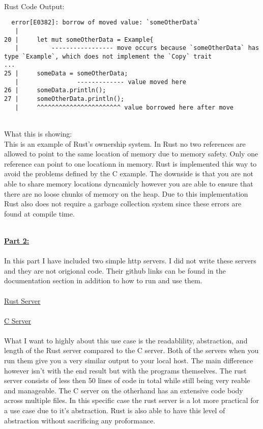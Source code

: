 \documentclass{article}
\theoremstyle{theorem}
\theoremstyle{definition}
\theoremstyle{remark}
\begin{document}
\\Rust Code Output:
\begin{lstlisting}
  error[E0382]: borrow of moved value: `someOtherData`
   |
20 |     let mut someOtherData = Example{
   |         ----------------- move occurs because `someOtherData` has type `Example`, which does not implement the `Copy` trait
...
25 |     someData = someOtherData;
   |                ------------- value moved here
26 |     someData.println();
27 |     someOtherData.println();
   |     ^^^^^^^^^^^^^^^^^^^^^^^ value borrowed here after move
\end{lstlisting}
\\What this is showing:
\\This is an example of Rust's ownership system. In Rust no two references are allowed to point to the same location of memory due to memory safety. Only one reference can point to one locationn in memory.
Rust is implemented this way to avoid the problems defined by the C example. The downside is that you are not able to share memory locations dyncamicly however you are able to ensure that there are no loose
chunks of memory on the heap. Due to this implementation Rust also does not require a garbage collection system since these errors are found at compile time.

\\\underline{ \textbf{Part 2:}}
\\
\\In this part I have included two simple http servers. I did not write these servers and they are not origional code. Their github links can be found in the documentation section in addition to how to run and use them.
\\
\\\href{https://github.com/jacgoldberg/Programming-Lang/blob/main/samplerustserver/http_server.rs}{Rust Server}
\\
\\\href{https://github.com/jacgoldberg/Programming-Lang/tree/main/samplecserver}{C Server}
\\
\\What I want to highly about this use case is the readablility, abstraction, and length of the Rust server compared to the C server. Both of the servers when you run them give you a very similar output to your local host.
The main difference however isn't with the end result but with the programs themselves. The rust server consists of less then 50 lines of code in total while still being very reable and manageable. The C server on the otherhand has an extensive code body across multiple files.
In this specific case the rust server is a lot more practical for a use case due to it's abstraction. Rust is also able to have this level of abstraction without sacrificing any proformance.
\end{document}
